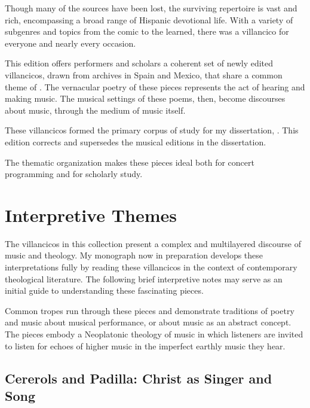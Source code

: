 Though many of the sources have been lost, the surviving repertoire is vast and rich, encompassing a broad range of Hispanic devotional life.
With a variety of subgenres and topics from the comic to the learned, there was a villancico for everyone and nearly every occasion.

This edition offers performers and scholars a coherent set of newly edited villancicos, drawn from archives in Spain and Mexico, that share a common theme of .
The vernacular poetry of these  pieces represents the act of hearing and making music.
The musical settings of these poems, then, become discourses about music, through the medium of music itself.%
  \begin{Footnote}
  These villancicos formed the primary corpus of study for my dissertation, \citemydiss.
  This edition corrects and supersedes the musical editions in the dissertation.
  \end{Footnote}
The thematic organization makes these pieces ideal both for concert programming and for scholarly study.

\section{Interpretive Themes}

The villancicos in this collection present a complex and multilayered discourse of music and theology.
My monograph now in preparation develops these interpretations fully by reading these villancicos in the context of contemporary theological literature.
The following brief interpretive notes may serve as an initial guide to understanding these fascinating pieces.

Common tropes run through these pieces and demonstrate traditions of poetry and music about musical performance, or about music as an abstract concept.
The pieces embody a Neoplatonic theology of music in which listeners are invited to listen for echoes of higher music in the imperfect earthly music they hear.


\subsection{Cererols and Padilla: Christ as Singer and Song}

